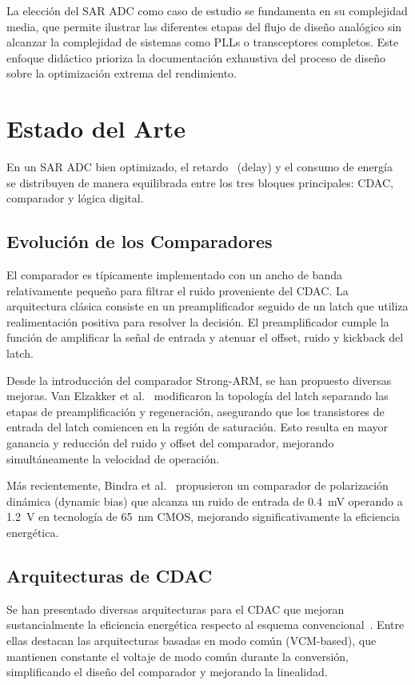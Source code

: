 \documentclass[12pt,a4paper]{report}
\begin{document}
La elección del SAR ADC como caso de estudio se fundamenta en su complejidad media, que permite ilustrar las diferentes etapas del flujo de diseño analógico sin alcanzar la complejidad de sistemas como PLLs o transceptores completos. Este enfoque didáctico prioriza la documentación exhaustiva del proceso de diseño sobre la optimización extrema del rendimiento.

\section{Estado del Arte}

En un SAR ADC bien optimizado, el retardo~\cite{murmann_sar} (delay) y el consumo de energía~\cite{lowpower_survey} se distribuyen de manera equilibrada entre los tres bloques principales: CDAC, comparador y lógica digital.

\subsection{Evolución de los Comparadores}

El comparador es típicamente implementado con un ancho de banda relativamente pequeño para filtrar el ruido proveniente del CDAC. La arquitectura clásica consiste en un preamplificador seguido de un latch que utiliza realimentación positiva para resolver la decisión. El preamplificador cumple la función de amplificar la señal de entrada y atenuar el offset, ruido y kickback del latch.

Desde la introducción del comparador Strong-ARM, se han propuesto diversas mejoras. Van Elzakker et al.~\cite{vanelzakker_sar} modificaron la topología del latch separando las etapas de preamplificación y regeneración, asegurando que los transistores de entrada del latch comiencen en la región de saturación. Esto resulta en mayor ganancia y reducción del ruido y offset del comparador, mejorando simultáneamente la velocidad de operación.

Más recientemente, Bindra et al.~\cite{bindra_comparator} propusieron un comparador de polarización dinámica (dynamic bias) que alcanza un ruido de entrada de 0.4~mV operando a 1.2~V en tecnología de 65~nm CMOS, mejorando significativamente la eficiencia energética.

\subsection{Arquitecturas de CDAC}

Se han presentado diversas arquitecturas para el CDAC que mejoran sustancialmente la eficiencia energética respecto al esquema convencional~\cite{lowpower_survey}. Entre ellas destacan las arquitecturas basadas en modo común (VCM-based), que mantienen constante el voltaje de modo común durante la conversión, simplificando el diseño del comparador y mejorando la linealidad.
\end{document}
